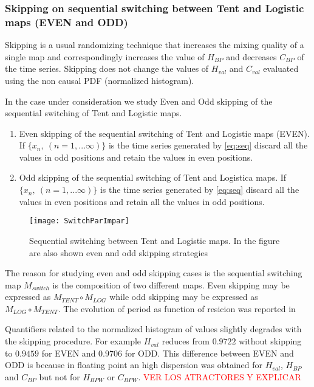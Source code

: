 \subsubsection{Skipping on sequential switching between Tent and Logistic maps (EVEN and ODD)} \label{sssec:skipp}

Skipping is a usual randomizing technique that increases the mixing quality of a single map and correspondingly increases the value of $H_{BP}$ and decreases $C_{BP} $ of the time series.
Skipping does not change the values of $H_{val}$ and $C_{val}$ evaluated using the non causal PDF (normalized histogram)\cite{DeMicco2008}.

In the case under consideration we study Even and Odd skipping of the sequential switching of Tent and Logistic maps.
\begin{enumerate}
	\item Even skipping of the sequential switching of Tent and Logistic maps (EVEN).\\
	If $\{x_n,~(n=1,...\infty)\}$ is the time series generated by \ref{eq:seq} discard all the values in odd positions and retain the values in even positions.
	\item Odd skipping of the sequential switching of Tent and Logistica maps.
	If $\{x_n,~(n=1,...\infty)\}$ is the time series generated by \ref{eq:seq} discard all the values in even positions and retain all the values in odd positions.
\end{enumerate}

\begin{figure}
	\texttt{[image: SwitchParImpar]}
	\caption{Sequential switching between Tent and Logistic maps. In the figure are also shown even and odd skipping strategies} \label{fig:seq}
\end{figure}

The reason for studying even and odd skipping cases is the sequential switching map $M_{switch}$ is the composition of two different maps. Even skipping may be expressed as $M_{TENT}\circ M_{LOG}$ while odd skipping may be expressed as $M_{LOG} \circ M_{TENT}$.
The evolution of period as function of resicion was reported in \

Quantifiers related to the normalized histogram of values slightly degrades with the skipping procedure. For example $H_{val}$ reduces from $0.9722$ without skipping to $0.9459$ for EVEN and $0.9706$ for ODD. 
This difference between EVEN and ODD is because in floating point an high dispersion was obtained for $H_{val}$, $H_{BP}$ and $C_{BP}$ but not for $H_{BPW}$ or $C_{BPW}$.
\textcolor{red}{VER LOS ATRACTORES Y EXPLICAR}

